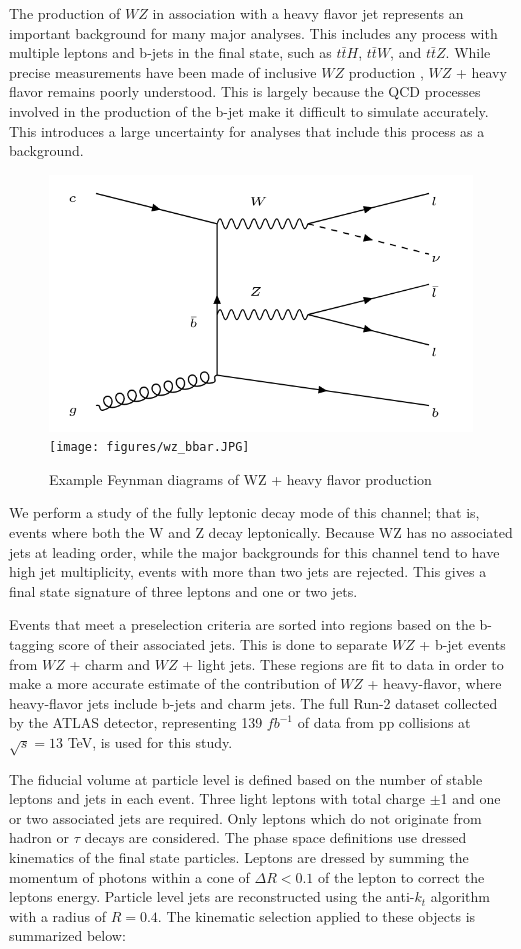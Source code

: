 
The production of $WZ$ in association with a heavy flavor jet represents an important background for many major analyses. This includes any process with multiple leptons and b-jets in the final state, such as $t\bar{t}H$, $t\bar{t}W$, and $t\bar{t}Z$. While precise measurements have been made of inclusive $WZ$ production \cite{WZ_36}, $WZ$ + heavy flavor remains poorly understood. This is largely because the QCD processes involved in the production of the b-jet make it difficult to simulate accurately. This introduces a large uncertainty for analyses that include this process as a background.  

\begin{figure}[H]
  \centering
  \includegraphics[width=0.55\linewidth]{figures/wz_3l.png}%
  \texttt{[image: figures/wz\_bbar.JPG]}
  \caption{Example Feynman diagrams of WZ + heavy flavor production}
  \label{fig:wz_feynman}
\end{figure}

We perform a study of the fully leptonic decay mode of this channel; that is, events where both the W and Z decay leptonically. Because WZ has no associated jets at leading order, while the major backgrounds for this channel tend to have high jet multiplicity, events with more than two jets are rejected. This gives a final state signature of three leptons and one or two jets.

Events that meet a preselection criteria are sorted into regions based on the b-tagging score of their associated jets. This is done to separate $WZ$ + b-jet events from $WZ$ + charm and $WZ$ + light jets. These regions are fit to data in order to make a more accurate estimate of the contribution of $WZ$ + heavy-flavor, where heavy-flavor jets include b-jets and charm jets. The full Run-2 dataset collected by the ATLAS detector, representing 139 $fb^{-1}$ of data from pp collisions at $\sqrt{s} = 13$ TeV, is used for this study.

The fiducial volume at particle level is defined based on the number of stable leptons and jets in each event. Three light leptons with total charge $\pm$1 and one or two associated jets are required. Only leptons which do not originate from hadron or $\tau$ decays are considered. The phase space definitions use dressed kinematics of the final state particles. Leptons are dressed by summing the momentum of photons within a cone of $\Delta R < 0.1$ of the lepton to correct the leptons energy. Particle level jets are reconstructed using the anti-$k_t$ algorithm with a radius of $R=0.4$. The kinematic selection applied to these objects is summarized below:

